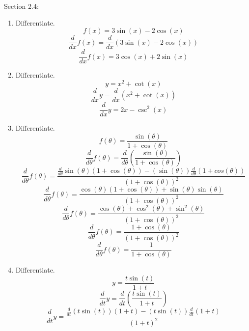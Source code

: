 \documentclass[12pt]{article}
\begin{document}
Section 2.4:
\begin{enumerate}
      \item Differentiate.
            \[f(x) = 3\sin(x) - 2\cos(x)\]
            \[{\displaystyle \frac{d}{dx}f(x) = \frac{d}{dx}(3\sin(x) - 2\cos(x))}\]
            \[\boxed{\displaystyle \frac{d}{dx}f(x) = 3\cos(x) + 2\sin(x)}\]
            \setcounter{enumi}{2}
      \item Differentiate.
            \[y = x^2 + \cot(x)\]
            \[{\displaystyle \frac{d}{dx}y = \frac{d}{dx}(x^2 + \cot(x))}\]
            \[{\displaystyle \frac{d}{dx}y = 2x - \csc^2(x)}\]
            \setcounter{enumi}{12}
            \newpage
      \item Differentiate.
            \[f(\theta) = \frac{\sin(\theta)}{1 + \cos(\theta)}\]
            \[\frac{d}{d\theta}f(\theta) = \frac{d}{d\theta}(\frac{\sin(\theta)}{1 + \cos(\theta)})\]
            \[\frac{d}{d\theta}f(\theta) = \frac{\frac{d}{d\theta}\sin(\theta)(1+\cos(\theta)) - (\sin(\theta))\frac{d}{d\theta}(1+cos(\theta))}{(1 + \cos(\theta))^2}\]
            \[\frac{d}{d\theta}f(\theta) = \frac{\cos(\theta)(1+\cos(\theta)) + \sin(\theta)\sin(\theta)}{(1 + \cos(\theta))^2}\]
            \[\frac{d}{d\theta}f(\theta) = \frac{\cos(\theta)+\cos^2(\theta) + \sin^2(\theta)}{(1 + \cos(\theta))^2}\]
            \[\frac{d}{d\theta}f(\theta) = \frac{1+\cos(\theta)}{(1 + \cos(\theta))^2}\]
            \[\boxed{\frac{d}{d\theta}f(\theta) = \frac{1}{1 + \cos(\theta)}}\]
            \setcounter{enumi}{18}
      \item Differentiate.
            \[y = \frac{t\sin(t)}{1 + t}\]
            \[\frac{d}{dt}y = \frac{d}{dt}(\frac{t\sin(t)}{1 + t})\]
            \[\frac{d}{dt}y = \frac{\frac{d}{dt}(t\sin(t))(1+t) - (t\sin(t))\frac{d}{dt}(1+t)}{(1 + t)^2}\]

\end{enumerate}
\end{document}
